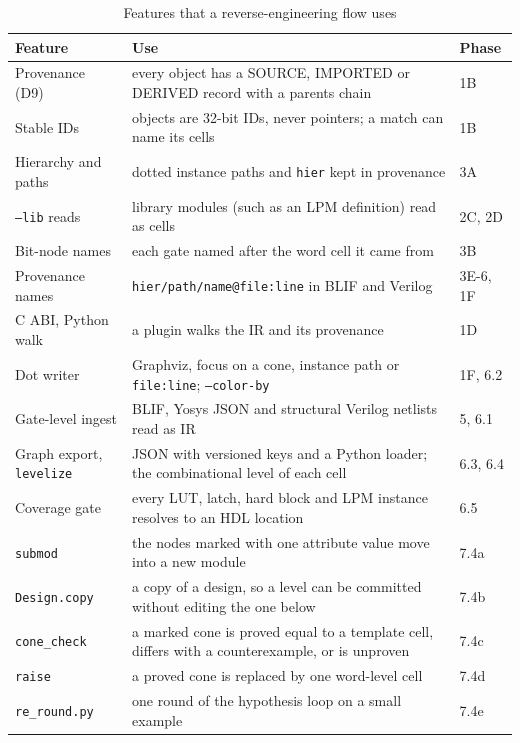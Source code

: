 \documentclass[conference]{IEEEtran}
\newcommand{\code}[1]{\texttt{#1}}
\begin{document}
\begin{table}[t]
\caption{Features that a reverse-engineering flow uses}
\label{tab:re-support}
\centering
\footnotesize
\begin{tabular}{@{}>{\raggedright\arraybackslash}p{}%
  >{\raggedright\arraybackslash}p{}p{}@{}}
\toprule
Feature & Use & Phase \\
\midrule
Provenance (D9) & every object has a SOURCE, IMPORTED or DERIVED record with a parents chain & 1B \\
Stable IDs & objects are 32-bit IDs, never pointers; a match can name its cells & 1B \\
Hierarchy and paths & dotted instance paths and \code{hier} kept in provenance &
  3A \\
\code{--lib} reads & library modules (such as an LPM definition) read as cells & 2C, 2D \\
Bit-node names & each gate named after the word cell it came from & 3B \\
Provenance names & \code{hier/path/name@file:line} in BLIF and Verilog & 3E-6, 1F \\
C ABI, Python walk & a plugin walks the IR and its provenance & 1D \\
Dot writer & Graphviz, focus on a cone, instance path or \code{file:line}; \code{--color-by} & 1F, 6.2 \\
Gate-level ingest & BLIF, Yosys JSON and structural Verilog netlists read as IR & 5, 6.1 \\
Graph export, \code{levelize} & JSON with versioned keys and a Python loader; the combinational level of each cell & 6.3, 6.4 \\
Coverage gate & every LUT, latch, hard block and LPM instance resolves to an HDL location & 6.5 \\
\code{submod} & the nodes marked with one attribute value move into a new module & 7.4a \\
\code{Design.copy} & a copy of a design, so a level can be committed without editing the one below & 7.4b \\
\code{cone\_check} & a marked cone is proved equal to a template cell, differs with a counterexample, or is unproven & 7.4c \\
\code{raise} & a proved cone is replaced by one word-level cell & 7.4d \\
\code{re\_round.py} & one round of the hypothesis loop on a small example & 7.4e \\
\bottomrule
\end{tabular}
\end{table}
\end{document}
